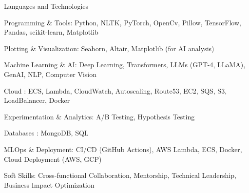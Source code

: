 

\begin{cventries}

  \cventry
    {Languages and Technologies}
    {}
    {}
    {}
    {
     \begin{cvitems} %
      \item {Programming \& Tools: Python, NLTK, PyTorch, OpenCv, Pillow, TensorFlow, Pandas, scikit-learn, Matplotlib}	
      \item {Plotting \& Visualization: Seaborn, Altair, Matplotlib (for AI analysis)}
      \item {Machine Learning \& AI: Deep Learning, Transformers, LLMs (GPT-4, LLaMA), GenAI, NLP, Computer Vision}	
      \item {Cloud : ECS, Lambda, CloudWatch, Autoscaling, Route53, EC2, SQS, S3, LoadBalancer, Docker}
      \item {Experimentation \& Analytics:  A/B Testing, Hypothesis Testing}
	    \item {Databases : MongoDB, SQL}
      \item {MLOps \& Deployment: CI/CD (GitHub Actions), AWS Lambda, ECS, Docker, Cloud Deployment (AWS, GCP)}
      \item {Soft Skills: Cross-functional Collaboration, Mentorship, Technical Leadership, Business Impact Optimization}
     \end{cvitems}
    }

\end{cventries}
